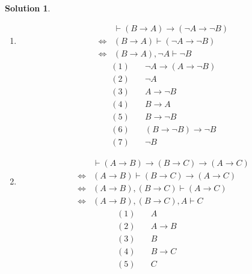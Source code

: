 \documentclass[a4paper, 12pt]{ctexart} %
\theoremstyle{plain}
\theoremstyle{definition}
\newtheorem*{solution}{Solution}
\theoremstyle{remark}
\begin{document}
\begin{solution}
    \begin{enumerate}
        \item[(1)]
        \begin{align*}
            & \vdash \left(B \to A  \right) \to \left( \neg A  \to \neg  B\right)\\
            \Leftrightarrow & \left(B \to A \right)  \vdash \left( \neg  A \to \neg B\right) \\ 
            \Leftrightarrow & \left( B \to A \right) , \neg A  \vdash \neg B
        \end{align*}
        \begin{align*}
            (1)\quad &\neg A \to \left(A \to \neg B \right)  \tag{thm 6}\\
            (2)\quad &\neg A \tag{已知} \\
            (3)\quad &A \to \neg B \tag{rmp} \\ 
            (4)\quad &B \to A  \tag{已知} \\
            (5)\quad &B \to \neg B \tag{(4),(3),thm 8} \\
            (6)\quad &\left(B \to \neg B \right) \to \neg B \tag{thm 10}\\
            (7)\quad &\neg B \tag{rmp} 
        \end{align*}
        \item[(2)]
        \begin{align*}
            & \vdash  \left(A \to B\right) \to \left(B \to C\right) \to \left(A \to C\right)\\
            \Leftrightarrow & \left(A \to B \right) \vdash \left(B \to C\right) \to \left(A \to C\right) \\
            \Leftrightarrow & \left(A \to B \right) , \left(B \to C\right) \vdash \left(A \to C\right) \\
            \Leftrightarrow & \left(A \to B \right) , \left( B \to C\right) , A \vdash C
        \end{align*}
        \begin{align*}
            (1)\quad &A \tag{已知} \quad \quad \quad \quad \\
            (2)\quad &A \to B \tag{已知} \quad \quad \quad \quad \\
            (3)\quad &B \tag{rmp} \quad \quad \quad \quad \\
            (4)\quad &B \to C \tag{已知} \quad \quad \quad \quad \\
            (5)\quad &C \tag{rmp}\quad \quad \quad \quad \\

\end{align*}
\end{enumerate}
\end{solution}
\end{document}
